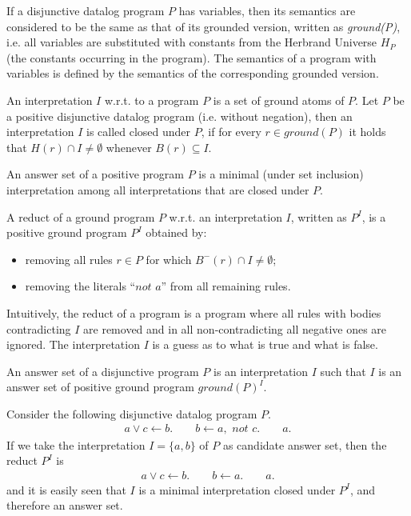 If a disjunctive datalog program $P$ has variables, then its semantics are considered to be the same as that of its grounded version, written as \textit{ground(P)}, i.e. all variables are substituted with constants from the Herbrand Universe $H_P$ (the constants occurring in the program). The semantics of a program with variables is defined by the semantics of the corresponding grounded version.

An interpretation $I$ w.r.t. to a program $P$ is a set of ground atoms of $P$. Let $P$ be a positive disjunctive datalog program (i.e. without negation), then an interpretation $I$ is called closed under $P$, if for every $r \in \textit{ground}(P)$ it holds that $H(r) \cap I \ne \emptyset$ whenever $B(r) \subseteq I$. 
\begin{definition}
An answer set of a positive program $P$ is a minimal (under set inclusion) interpretation among all interpretations that are closed under $P$.
\end{definition}

\begin{definition} 
A reduct of a ground program $P$ w.r.t. an interpretation $I$, written as $P^I$, is  a positive ground program $P^I$ obtained by: 
\begin{itemize}
   \item removing all rules $r \in P$ for which $B^{-}(r) \cap I \ne \emptyset$;
   \item removing the literals ``$\textit{not }a$'' from all remaining rules.
 \end{itemize}
\end{definition}
Intuitively, the reduct of a program is a program where all rules with bodies contradicting $I$ are removed and in all non-contradicting all negative ones are ignored. The interpretation $I$ is a guess as to what is true and what is false.

\begin{definition}
An answer set of a disjunctive program $P$ is an interpretation $I$ such that $I$ is an answer set of positive ground program $\textit{ground}(P)^I$. 
\end{definition}

\begin{example} Consider the following disjunctive datalog program $P$.
  \begin{eqnarray*}
    a \vee c  \leftarrow  b. \quad \quad b  \leftarrow  a, \textit{ not }c. \quad \quad a.
  \end{eqnarray*}
If we take the interpretation $I=\{a,b\}$ of $P$ as candidate answer set, then the reduct $P^I$ 
is  
\begin{eqnarray*}
    a \vee c \leftarrow b. \quad \quad   b \leftarrow a. \quad \quad  a.
\end{eqnarray*}
and it is easily seen that $I$ is a minimal interpretation closed under $P^I$, and therefore an answer set. %
\end{example}

